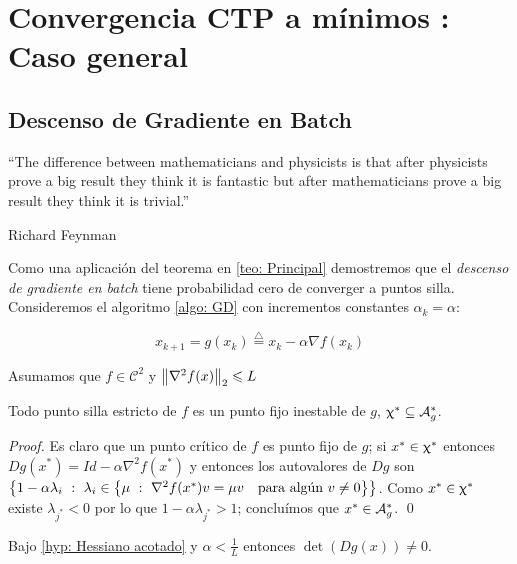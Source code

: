 \chapter{Convergencia CTP a m\'inimos : Caso general}\label{ch: aplicaciones}
\section{Descenso de Gradiente en Batch}

\epigraph{“The difference between mathematicians and physicists is that after physicists prove a big result they think it is fantastic but after mathematicians prove a big result they think it is trivial.”}{Richard Feynman}

Como una aplicaci\'on del teorema en \ref{teo: Principal} demostremos que el \textit{descenso de gradiente en batch} tiene probabilidad cero de converger a puntos silla. Consideremos el algoritmo \ref{algo: GD} con incrementos constantes $\alpha_k = \alpha$:

\begin{equation}
	\label{eq: GD}
	x_{k+1} = g(x_k) \stackrel{\triangle}{=} x_k - \alpha \nabla f(x_k)
\end{equation}

\begin{hyp}
	\label{hyp: Hessiano acotado}
	Asumamos que $f \in \mathcal{C}^2$ y $\left\lVert\nabla^2 f(x)\right\rVert_2 \leqslant L$
\end{hyp}

\begin{proposition}
	\label{prop: GD los puntos silla estrictos son fijos inestables}
	Todo punto silla estricto de $f$ es un punto fijo inestable de $g$, \ie $\upchi^* \subseteq \mathcal{A}_{g}^{*}$.
\end{proposition}

\begin{proof}
	Es claro que un punto cr\'itico de $f$ es punto fijo de $g$; si $x^* \in \upchi^*$ entonces $Dg(x^*) = Id - \alpha \nabla^2 f(x^*)$ y entonces los autovalores de $Dg$ son $\left\lbrace1 - \alpha \lambda_i ~:~ \lambda_i \in \left\lbrace\mu ~:~ \nabla^2 f(x^*)v = \mu v \quad \text{para alg\'un } v \neq 0\right\rbrace\right\rbrace$. Como $x^* \in \upchi^*$ existe $\lambda_{j^*} < 0$ por lo que $1 - \alpha\lambda_{j^*} >1$; conclu\'imos que $x^{*} \in \mathcal{A}_{g}^{*}$. \qed
	
	
\end{proof}

\begin{proposition}
	\label{prop: GD g es difeo local}
	Bajo \ref{hyp: Hessiano acotado} y $\alpha < \frac{1}{L}$ entonces $\det \left(Dg (x)\right) \neq 0$.
\end{proposition}

